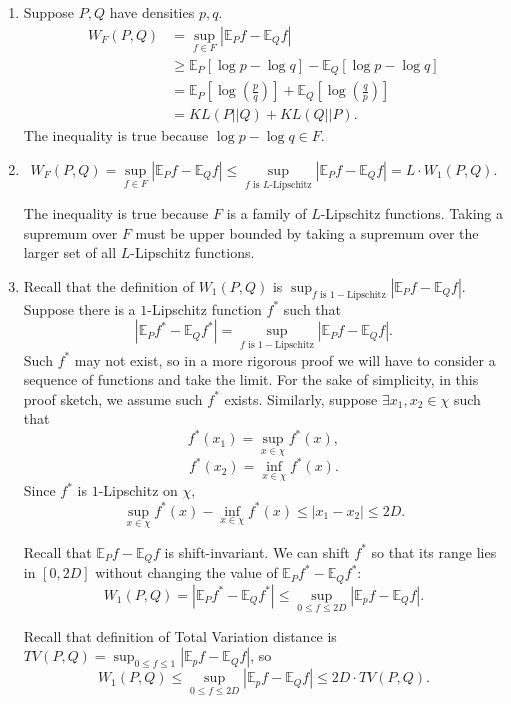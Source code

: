 \documentclass[11pt]{article}
\begin{document}
\begin{enumerate}
\item 
Suppose $P,Q$ have densities $p,q.$
\begin{align*}
W_F(P,Q)
&=\sup_{f
\in F}{|\mathbb{E}_P{f}-\mathbb{E}_Q{f}|} \\
&\geq \mathbb{E}_P[\log p-\log q]-\mathbb{E}_Q[\log p-\log q]\\
&= \mathbb{E}_P[\log{\left(\frac{p}{q}\right)}]+\mathbb{E}_Q[\log{\left(\frac{q}{p}\right)}]\\
&= KL(P||Q)+KL(Q||P).
\end{align*}
The inequality is true because $\log p-\log q\in F.$
\item %
$$W_F(P,Q)= \sup_{f\in F} |\mathbb{E}_Pf-\mathbb{E}_Qf|\leq \sup_{f\text{ is $L$-Lipschitz}}|\mathbb{E}_Pf-\mathbb{E}_Qf|=L \cdot W_1(P,Q).$$



The inequality is true because $F$ is a family of $L$-Lipschitz functions. Taking a supremum over $F$ must be upper bounded by taking a supremum over the larger set of all $L$-Lipschitz functions. 



\item  Recall that the definition of $W_1(P, Q)$ is $\sup_{f \text{ is } 1-\text{Lipschitz}}{|\mathbb{E}_P{f}-\mathbb{E}_Q{f}|}$. Suppose there is a $1$-Lipschitz function $f^*$ such that $$|\mathbb{E}_P{f^*}-\mathbb{E}_Q{f^*}|= \sup_{f \text{ is } 1-\text{Lipschitz}}{|\mathbb{E}_P{f}-\mathbb{E}_Q{f}|}.$$ Such $f^*$ may not exist, so in a more rigorous proof we will have to consider a sequence of functions and take the limit. For the sake of simplicity, in this proof sketch, we assume such $f^*$ exists. Similarly, suppose $ \exists x_1, x_2 \in \chi $ such that $$f^*(x_1)=\sup_{x \in \chi} f^*(x),$$ $$f^*(x_2)=\inf_{x \in \chi} f^*(x).$$ Since $f^*$ is $1$-Lipschitz on $\chi$, $$\sup_{x \in \chi} f^*(x)-\inf_{x \in \chi} f^*(x) \leq |x_1-x_2| \leq 2D.$$ 

Recall that $\mathbb{E}_P{f}-\mathbb{E}_Q{f}$ is shift-invariant. We can shift $f^*$ so that its range lies in $[0, 2D]$ without changing the value of $\mathbb{E}_P{f^*}-\mathbb{E}_Q{f^*}$:
$$W_1(P,Q) = |\mathbb{E}_P{f^*}-\mathbb{E}_Q{f^*}|  \leq \sup_{0 \leq f \le 2D}{|\mathbb{E}_p{f}-\mathbb{E}_Q{f}|}.$$ 

Recall that definition of Total Variation distance is $TV(P,Q) = \sup_{0 \leq f \le 1}{|\mathbb{E}_p{f}-\mathbb{E}_Q{f}|}$, so $$W_1(P,Q) \le \sup_{0 \leq f \le 2D}{|\mathbb{E}_p{f}-\mathbb{E}_Q{f}|} \le 2D \cdot  TV(P,Q).$$


\end{enumerate}
\end{document}
